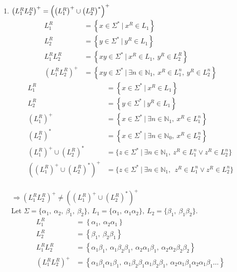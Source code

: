 \documentclass[a4paper,12pt]{article}
\begin{document}
\begin{enumerate}
	\item $\left(L_1^RL_2^R\right)^+=\left(\left(L_1^R \right)^+\cup \left(L_2^R \right)^*\right)^+\\$ \begin{align*}
		L_1^R&=\left\{x\in\Sigma^*\>|\>x^R\in L_1\right\}\\
		L_2^R&=\left\{y\in\Sigma^*\>|\>y^R\in L_1\right\}\\
		L_1^RL_2^R&=\left\{xy\in\Sigma^*\>|\>x^R\in L_1,\>y^R\in L_2^R\right\}\\
		\left(L_1^RL_2^R\right)^+&=\left\{xy\in\Sigma^*\>|\>\exists n\in\mathbb{N}_1,\>x^R\in L_1^n,\>y^R\in L_2^n\right\}
	\end{align*}
	\begin{align*}
		L_1^R&=\left\{x\in\Sigma^*\>|\>x^R\in L_1\right\}\\
		L_2^R&=\left\{y\in\Sigma^*\>|\>y^R\in L_1\right\}\\
		\left(L_1^R\right)^+&=\left\{x\in\Sigma^*\>|\>\exists n\in\mathbb{N}_1,\>x^R\in L_1^n\right\}\\
		\left(L_2^R\right)^*&=\left\{x\in\Sigma^*\>|\>\exists n\in\mathbb{N}_0,\>x^R\in L_2^n\right\}\\
		\left(L_1^R \right)^+\cup \left(L_2^R \right)^*&=\{z\in\Sigma^*\>|\>\exists n\in\mathbb{N}_1,\>z^R\in L_1^n\lor z^R\in L_2^n\}\\
		\left(\left(L_1^R \right)^+\cup \left(L_2^R \right)^*\right)^+&=\{z\in\Sigma^*\>|\>\exists n\in\mathbb{N}_1,\>\>z^R\in L_1^n\lor z^R\in L_2^n \}
	\end{align*}\\$\Rightarrow\left(L_1^RL_2^R\right)^+\neq\left(\left(L_1^R \right)^+\cup \left(L_2^R \right)^*\right)^+$ \\Let $\Sigma=\{\alpha_1,\>\alpha_2,\>\beta_1,\>\beta_2\},\>L_1=\{\alpha_1,\>\alpha_1\alpha_2\},\>L_2=\{\beta_1,\>\beta_1\beta_2\}.$
	\begin{align*}
		L_1^R&=\left\{\alpha_1,\>\alpha_2\alpha_1\right\}\\
		L_2^R&=\left\{\beta_1,\>\beta_2\beta_1\right\}\\
		L_1^RL_2^R&=\left\{\alpha_1\beta_1,\>\alpha_1\beta_2\beta_1,\>\alpha_2\alpha_1\beta_1,\>\alpha_2\alpha_2\beta_2\beta_2\right\}\\
		\left(L_1^RL_2^R\right)^+&=\left\{\alpha_1\beta_1\alpha_1\beta_1,\>\alpha_1\beta_2\beta_1\alpha_1\beta_2\beta_1,\>\alpha_2\alpha_1\beta_1\alpha_2\alpha_1\beta_1\dots \right\}
	\end{align*}

\end{enumerate}
\end{document}
